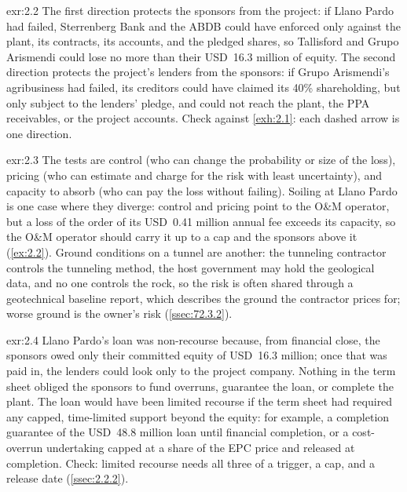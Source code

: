 \begin{solution}{exr:2.2}
The first direction protects the sponsors from the project: if Llano Pardo had failed, Sterrenberg Bank and the ABDB could have enforced only against the plant, its contracts, its accounts, and the pledged shares, so Tallisford and Grupo Arismendi could lose no more than their USD~16.3 million of equity. The second direction protects the project's lenders from the sponsors: if Grupo Arismendi's agribusiness had failed, its creditors could have claimed its 40\% shareholding, but only subject to the lenders' pledge, and could not reach the plant, the PPA receivables, or the project accounts. Check against \cref{exh:2.1}: each dashed arrow is one direction.
\end{solution}

\begin{solution}{exr:2.3}
The tests are control (who can change the probability or size of the loss), pricing (who can estimate and charge for the risk with least uncertainty), and capacity to absorb (who can pay the loss without failing). Soiling at Llano Pardo is one case where they diverge: control and pricing point to the O\&M operator, but a loss of the order of its USD~0.41 million annual fee exceeds its capacity, so the O\&M operator should carry it up to a cap and the sponsors above it (\cref{ex:2.2}). Ground conditions on a tunnel are another: the tunneling contractor controls the tunneling method, the host government may hold the geological data, and no one controls the rock, so the risk is often shared through a geotechnical baseline report, which describes the ground the contractor prices for; worse ground is the owner's risk (\cref{ssec:72.3.2}).
\end{solution}

\begin{solution}{exr:2.4}
Llano Pardo's loan was non-recourse because, from financial close, the sponsors owed only their committed equity of USD~16.3 million; once that was paid in, the lenders could look only to the project company. Nothing in the term sheet obliged the sponsors to fund overruns, guarantee the loan, or complete the plant. The loan would have been limited recourse if the term sheet had required any capped, time-limited support beyond the equity: for example, a completion guarantee of the USD~48.8 million loan until financial completion, or a cost-overrun undertaking capped at a share of the EPC price and released at completion. Check: limited recourse needs all three of a trigger, a cap, and a release date (\cref{ssec:2.2.2}).
\end{solution}


